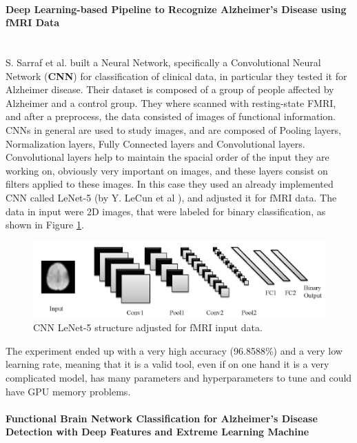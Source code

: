\paragraph{Deep Learning-based Pipeline to Recognize Alzheimer’s Disease using fMRI Data}\
\\

S. Sarraf et al. \cite{Sarraf066910} built a Neural Network, specifically a Convolutional Neural Network (\textbf{CNN}) for classification of clinical data, in particular they tested it for Alzheimer disease. Their dataset is composed of a group of people affected by Alzheimer and a control group. They where scanned with resting-state FMRI, and after a preprocess, the data consisted of images of functional information. 
\\

CNNs in general are used to study images, and are composed of Pooling layers, Normalization layers, Fully Connected layers and Convolutional layers. Convolutional layers help to maintain the spacial order of the input they are working on, obviously very important on images, and these layers consist on filters applied to these images. In this case they used an already implemented CNN called LeNet-5 (by Y. LeCun et al \cite{726791}), and adjusted it for fMRI data. The data in input were 2D images, that were labeled for binary classification, as shown in Figure \ref{fig:diagram7}.

\begin{figure}[htbp]
	\centering
	\includegraphics[scale=1]{Immagini/deep-learning1.PNG}
	\caption{CNN LeNet-5 structure adjusted for fMRI input data.}
	\label{fig:diagram7}
\end{figure}

The experiment ended up with a very high accuracy (96.8588\%) and a very low learning rate, meaning that it is a valid tool, even if on one hand it is a very complicated model, has many parameters and hyperparameters to tune and could have GPU memory problems.

\paragraph{Functional Brain Network Classification for Alzheimer’s Disease Detection with Deep Features and Extreme Learning Machine}\
\\

